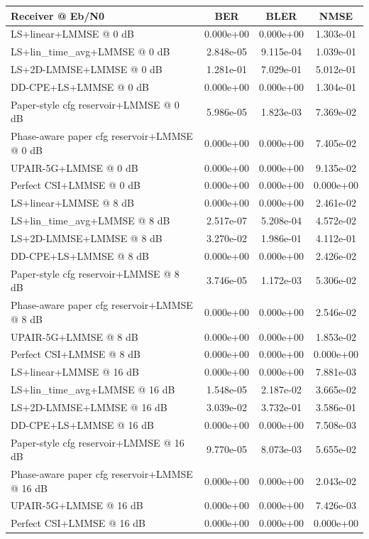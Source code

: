 \begin{tabular}{lccc}
\toprule
Receiver @ Eb/N0 & BER & BLER & NMSE \\
\midrule
LS+linear+LMMSE @ 0 dB & 0.000e+00 & 0.000e+00 & 1.303e-01 \\
LS+lin_time_avg+LMMSE @ 0 dB & 2.848e-05 & 9.115e-04 & 1.039e-01 \\
LS+2D-LMMSE+LMMSE @ 0 dB & 1.281e-01 & 7.029e-01 & 5.012e-01 \\
DD-CPE+LS+LMMSE @ 0 dB & 0.000e+00 & 0.000e+00 & 1.304e-01 \\
Paper-style cfg reservoir+LMMSE @ 0 dB & 5.986e-05 & 1.823e-03 & 7.369e-02 \\
Phase-aware paper cfg reservoir+LMMSE @ 0 dB & 0.000e+00 & 0.000e+00 & 7.405e-02 \\
UPAIR-5G+LMMSE @ 0 dB & 0.000e+00 & 0.000e+00 & 9.135e-02 \\
Perfect CSI+LMMSE @ 0 dB & 0.000e+00 & 0.000e+00 & 0.000e+00 \\
\midrule
LS+linear+LMMSE @ 8 dB & 0.000e+00 & 0.000e+00 & 2.461e-02 \\
LS+lin_time_avg+LMMSE @ 8 dB & 2.517e-07 & 5.208e-04 & 4.572e-02 \\
LS+2D-LMMSE+LMMSE @ 8 dB & 3.270e-02 & 1.986e-01 & 4.112e-01 \\
DD-CPE+LS+LMMSE @ 8 dB & 0.000e+00 & 0.000e+00 & 2.426e-02 \\
Paper-style cfg reservoir+LMMSE @ 8 dB & 3.746e-05 & 1.172e-03 & 5.306e-02 \\
Phase-aware paper cfg reservoir+LMMSE @ 8 dB & 0.000e+00 & 0.000e+00 & 2.546e-02 \\
UPAIR-5G+LMMSE @ 8 dB & 0.000e+00 & 0.000e+00 & 1.853e-02 \\
Perfect CSI+LMMSE @ 8 dB & 0.000e+00 & 0.000e+00 & 0.000e+00 \\
\midrule
LS+linear+LMMSE @ 16 dB & 0.000e+00 & 0.000e+00 & 7.881e-03 \\
LS+lin_time_avg+LMMSE @ 16 dB & 1.548e-05 & 2.187e-02 & 3.665e-02 \\
LS+2D-LMMSE+LMMSE @ 16 dB & 3.039e-02 & 3.732e-01 & 3.586e-01 \\
DD-CPE+LS+LMMSE @ 16 dB & 0.000e+00 & 0.000e+00 & 7.508e-03 \\
Paper-style cfg reservoir+LMMSE @ 16 dB & 9.770e-05 & 8.073e-03 & 5.655e-02 \\
Phase-aware paper cfg reservoir+LMMSE @ 16 dB & 0.000e+00 & 0.000e+00 & 2.043e-02 \\
UPAIR-5G+LMMSE @ 16 dB & 0.000e+00 & 0.000e+00 & 7.426e-03 \\
Perfect CSI+LMMSE @ 16 dB & 0.000e+00 & 0.000e+00 & 0.000e+00 \\
\bottomrule
\end{tabular}